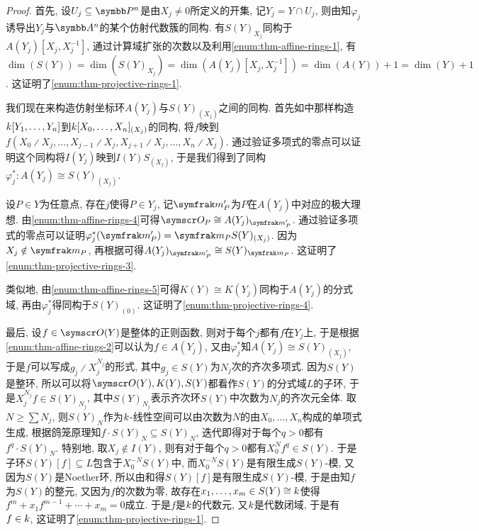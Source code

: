 \begin{proof}
  首先, 设$U_j\subseteq\PP^n$是由$X_j\neq 0$所定义的开集, 记$Y_j=Y\cap U_j$, 则由知$\varphi_j$诱导出$Y_j$与$\AF^n$的某个仿射代数簇的同构. 有$S(Y)_{X_j}$同构于$A(Y_j)[X_j, X_j^{-1}]$, 通过计算域扩张的次数以及利用\ref{enum:thm-affine-rings-1}, 有$\dim (S(Y))=\dim (S(Y)_{X_j})=\dim (A(Y_j)[X_j, X_j^{-1}])=\dim (A(Y))+1=\dim (Y)+1$. 这证明了\ref{enum:thm-projective-rings-1}.

  我们现在来构造仿射坐标环$A(Y_j)$与$S(Y)_{(X_j)}$之间的同构. 首先如中那样构造$k [Y_1, \dotsc, Y_n]$到$k [X_0, \dotsc, X_n]_{(X_j)}$的同构, 将$f$映到$f(X_0{\divslash}X_j, \dotsc, X_{j-1}{\divslash}X_j, X_{j+1}{\divslash}X_j, \dotsc, X_n{\divslash}X_j)$. 通过验证多项式的零点可以证明这个同构将$I(Y_j)$映到$I(Y)S_{(X_j)}$, 于是我们得到了同构$\varphi_j^*\colon A(Y_j)\cong S(Y)_{(X_j)}$.

  设$P\in Y$为任意点, 存在$j$使得$P\in Y_j$, 记$\ideal{m}_P'$为$P$在$A(Y_j)$中对应的极大理想. 由\ref{enum:thm-affine-rings-4}可得$\OO_P\cong A(Y_j)_{\ideal{m}_P'}$. 通过验证多项式的零点可以证明$\varphi_{j}^*(\ideal{m}_P')=\ideal{m}_PS(Y)_{(X_j)}$. 因为$X_j\notin \ideal{m}_P$, 再根据可得$A(Y_j)_{\ideal{m}_P'}\cong S(Y)_{\ideal{m}_P}$. 这证明了\ref{enum:thm-projective-rings-3}.

  类似地, 由\ref{enum:thm-affine-rings-5}可得$K(Y)\cong K(Y_j)$同构于$A(Y_j)$的分式域, 再由$\varphi_j^*$得同构于$S(Y)_{(0)}$. 这证明了\ref{enum:thm-projective-rings-4}.

  最后, 设$f\in\OO (Y)$是整体的正则函数, 则对于每个$j$都有$f$在$Y_j$上, 于是根据\ref{enum:thm-affine-rings-2}可以认为$f\in A(Y_j)$, 又由$\varphi_j^*$知$A(Y_j)\cong S(Y)_{(X_j)}$, 于是$f$可以写成$g_j{\divslash}X_j^{N_j}$的形式, 其中$g_j\in S(Y)$为$N_j$次的齐次多项式. 因为$S(Y)$是整环, 所以可以将$\OO (Y), K(Y), S(Y)$都看作$S(Y)$的分式域$L$的子环, 于是$X_j^{N_j}f\in S(Y)_{N_j}$, 其中$S(Y)_{N_j}$表示齐次环$S(Y)$中次数为$N_j$的齐次元全体. 取$N\geq \sum N_j$, 则$S(Y)_N$作为$k$-线性空间可以由次数为$N$的由$X_0, \dotsc, X_n$构成的单项式生成, 根据鸽笼原理知$f\cdot S(Y)_N\subseteq S(Y)_N$, 迭代即得对于每个$q>0$都有$f^q\cdot S(Y)_N$. 特别地, 取$X_j\notin I(Y)$, 则有对于每个$q>0$都有$X_0^Nf^q\in S(Y)$. 于是子环$S(Y)[f]\subseteq L$包含于$X_0^{-N}S(Y)$中, 而$X_0^{-N}S(Y)$是有限生成$S(Y)$-模, 又因为$S(Y)$是Noether环, 所以由和得$S(Y)[f]$是有限生成$S(Y)$-模, 于是由知$f$为$S(Y)$的整元, 又因为$f$的次数为零, 故存在$x_1, \dotsc, x_m\in S(Y)\cong k$使得$f^m+x_1f^{m-1}+\dotsb +x_m=0$成立. 于是$f$是$k$的代数元, 又$k$是代数闭域, 于是有$f\in k$, 这证明了\ref{enum:thm-projective-rings-1}.
\end{proof}

